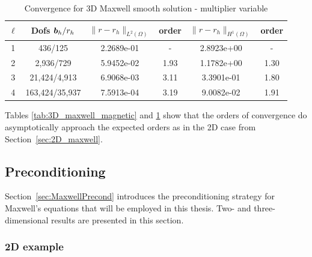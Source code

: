 \begin{table}[h!] \small
\begin{center}
    \begin{tabular}{cccccc}
    \hline
$\ell$ &    Dofs $\boldsymbol b_h/r_h$ & $\|{r}-{r}_h\|_{L^2(\Omega)}$ & order & $\|{r}-{r}_h\|_{H^1(\Omega)}$ & order\\
    \hline
 1 &     436/125 &  2.2689e-01 &    - &  2.8923e+00 &     - \\
 2 &    2,936/729 &  5.9452e-02 &    1.93 &  1.1782e+00 &     1.30 \\
 3 &   21,424/4,913 &  6.9068e-03 &    3.11 &  3.3901e-01 &     1.80 \\
 4 &  163,424/35,937 &  7.5913e-04 &    3.19 &  9.0082e-02 &     1.91 \\

    \hline
    \end{tabular}
\caption{Convergence for 3D Maxwell smooth solution - multiplier variable}
\label{tab:3D_maxwell_multiplier}
\end{center}
\end{table}


Tables \ref{tab:3D_maxwell_magnetic} and \ref{tab:3D_maxwell_multiplier} show that the orders of convergence do asymptotically approach the expected orders as in the 2D case from Section~\ref{sec:2D_maxwell}.




\subsection{Preconditioning}

Section~\ref{sec:MaxwellPrecond} introduces the preconditioning strategy for Maxwell's equations that will be employed in this thesis. Two- and three-dimensional results are presented in this section.

\subsubsection{2D example}

